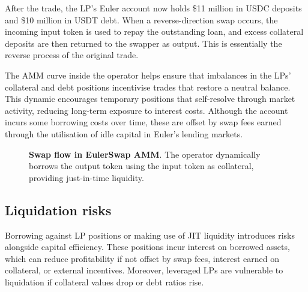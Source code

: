 \documentclass{article}
\begin{document}
After the trade, the LP’s Euler account now holds \$11 million in USDC deposits and \$10 million in USDT debt. When a reverse-direction swap occurs, the incoming input token is used to repay the outstanding loan, and excess collateral deposits are then returned to the swapper as output. This is essentially the reverse process of the original trade.

The AMM curve inside the operator helps ensure that imbalances in the LPs’ collateral and debt positions incentivise trades that restore a neutral balance. This dynamic encourages temporary positions that self-resolve through market activity, reducing long-term exposure to interest costs. Although the account incurs some borrowing costs over time, these are offset by swap fees earned through the utilisation of idle capital in Euler’s lending markets.

\begin{figure}[h]
\centering
{}
\caption{\textbf{Swap flow in EulerSwap AMM}. The operator dynamically borrows the output token using the input token as collateral, providing just-in-time liquidity.}
\label{fig:EulerSwap_liquidity}

\end{figure}

\subsection{Liquidation risks}

Borrowing against LP positions or making use of JIT liquidity introduces risks alongside capital efficiency. These positions incur interest on borrowed assets, which can reduce profitability if not offset by swap fees, interest earned on collateral, or external incentives. Moreover, leveraged LPs are vulnerable to liquidation if collateral values drop or debt ratios rise.
\end{document}
